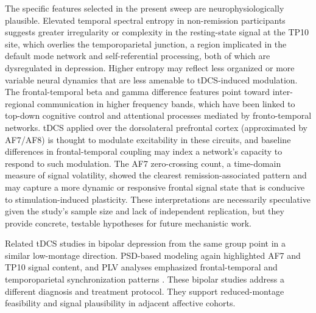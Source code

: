 The specific features selected in the present sweep are neurophysiologically plausible. Elevated temporal spectral entropy in non-remission participants suggests greater irregularity or complexity in the resting-state signal at the TP10 site, which overlies the temporoparietal junction, a region implicated in the default mode network and self-referential processing, both of which are dysregulated in depression. Higher entropy may reflect less organized or more variable neural dynamics that are less amenable to tDCS-induced modulation. The frontal-temporal beta and gamma difference features point toward inter-regional communication in higher frequency bands, which have been linked to top-down cognitive control and attentional processes mediated by fronto-temporal networks. tDCS applied over the dorsolateral prefrontal cortex (approximated by AF7/AF8) is thought to modulate excitability in these circuits, and baseline differences in frontal-temporal coupling may index a network's capacity to respond to such modulation. The AF7 zero-crossing count, a time-domain measure of signal volatility, showed the clearest remission-associated pattern and may capture a more dynamic or responsive frontal signal state that is conducive to stimulation-induced plasticity. These interpretations are necessarily speculative given the study's sample size and lack of independent replication, but they provide concrete, testable hypotheses for future mechanistic work.

Related tDCS studies in bipolar depression from the same group point in a similar low-montage direction. PSD-based modeling again highlighted AF7 and TP10 signal content, and PLV analyses emphasized frontal-temporal and temporoparietal synchronization patterns \citep{Moncy2025BD,Xiao2025JAD}. These bipolar studies address a different diagnosis and treatment protocol. They support reduced-montage feasibility and signal plausibility in adjacent affective cohorts.

